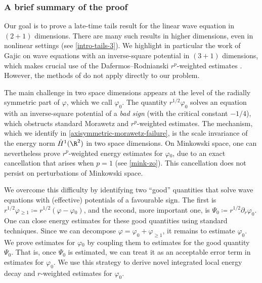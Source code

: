 \documentclass[10pt, reqno]{amsart}
\begin{document}
\subsubsection{A brief summary of the proof}
\label{intro-proof-summary} Our goal is to prove a late-time tails result for the
linear wave equation in \((2 + 1)\) dimensions. There are many such results
in higher dimensions, even in nonlinear settings (see \cref{intro-tails-3}). We
highlight in particular the work of Gajic \cite{GAJIC2023110058} on wave
equations with an inverse-square potential in \((3 + 1)\) dimensions, which
makes crucial use of the Dafermos--Rodnianski \(r^p\)-weighted estimates
\cite{rp-method}. However, the methods of \cite{rp-method,GAJIC2023110058} do not
apply directly to our problem.

The main challenge in two space dimensions appears at the level of the radially
symmetric part of \(\varphi{}\), which we call \(\varphi_0\). The quantity
\(r^{1/2}\varphi_0\) solves an equation with an inverse-square potential of a
\emph{bad sign} (with the critical constant \(-1/4\)), which obstructs standard
Morawetz and \(r^p\)-weighted estimates. The mechanism, which we identify
in \cref{axisymmetric-morawetz-failure}, is the scale invariance of the energy norm
\(\dot{H}^1(\R^2)\) in two space dimensions. On Minkowski space, one can
nevertheless prove \(r^p\)-weighted energy estimates for \(\varphi{}_0\), due to
an exact cancellation that arises when \(p = 1\) (see \cref{mink-zo}). This
cancellation does not persist on perturbations of Minkowski space.

We overcome this difficulty by identifying two ``good'' quantities that solve wave
equations with (effective) potentials of a favourable sign. The first is
\(r^{1/2}\varphi{}_{\ge 1}\coloneqq{}r^{1/2}(\varphi{}-\varphi{}_0)\), and the second, more important one, is \(\Psi_0 \coloneqq{}r^{1/2}\partial_r\varphi_0\).
One can close energy estimates for these good quantities using standard
techniques. Since we can decompose \(\varphi{} = \varphi_0 + \varphi_{\ge 1}\),
it remains to estimate \(\varphi_0\). We prove estimates for \(\varphi{}_0\) by
coupling them to estimates for the good quantity \(\Psi_0\). That is, once
\(\Psi_0\) is estimated, we can treat it as an acceptable error term in
estimates for \(\varphi_0\). We use this strategy to derive novel integrated
local energy decay and \(r\)-weighted estimates for \(\varphi_0\).
\end{document}
